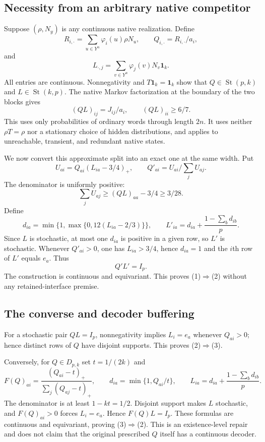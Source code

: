 \documentclass[11pt]{article}
\theoremstyle{remark}\newtheorem{remark}[theorem]{Remark}
\newcommand{\one}{\mathbf 1}
\newcommand{\St}{\operatorname{St}}
\begin{document}
\subsection{Necessity from an arbitrary native competitor}
Suppose $(\rho,N_y)$ is any continuous native realization. Define
\[
 R_{i,\cdot}=\sum_{u\in Y^n}\varphi_i(u)\rho N_u,
 \qquad Q_{i,\cdot}=R_{i,\cdot}/a_i,
\]
and
\[
 L_{\cdot,j}=\sum_{v\in Y^n}\varphi_j(v)N_v\one_k.
\]
All entries are continuous. Nonnegativity and $T\one_k=\one_k$ show that $Q\in\St(p,k)$ and $L\in\St(k,p)$. The native Markov factorization at the boundary of the two blocks gives
\[
 (QL)_{ij}=J_{ij}/a_i,
 \qquad (QL)_{ii}\geq6/7.
\]
This uses only probabilities of ordinary words through length $2n$. It uses neither $\rho T=\rho$ nor a stationary choice of hidden distributions, and applies to unreachable, transient, and redundant native states.

We now convert this approximate split into an exact one at the same width. Put
\[
 U_{ai}=Q_{ai}(L_{ia}-3/4)_+,\qquad
 Q'_{ai}=U_{ai}/\sum_jU_{aj}.
\]
The denominator is uniformly positive:
\[
 \sum_jU_{aj}\geq(QL)_{aa}-3/4\geq3/28.
\]
Define
\[
 d_{ia}=\min\{1,\max\{0,12(L_{ia}-2/3)\}\},\qquad
 L'_{ia}=d_{ia}+\frac{1-\sum_bd_{ib}}p.
\]
Since $L$ is stochastic, at most one $d_{ia}$ is positive in a given row, so $L'$ is stochastic. Whenever $Q'_{ai}>0$, one has $L_{ia}>3/4$, hence $d_{ia}=1$ and the $i$th row of $L'$ equals $e_a$. Thus
\[
 Q'L'=I_p.
\]
The construction is continuous and equivariant. This proves (1)$\Rightarrow$(2) without any retained-interface premise.

\subsection{The converse and decoder buffering}
For a stochastic pair $QL=I_p$, nonnegativity implies $L_i=e_a$ whenever $Q_{ai}>0$; hence distinct rows of $Q$ have disjoint supports. This proves (2)$\Rightarrow$(3).

Conversely, for $Q\in D_{p,k}$ set $t=1/(2k)$ and
\[
 F(Q)_{ai}=\frac{(Q_{ai}-t)_+}{\sum_j(Q_{aj}-t)_+},\qquad
 d_{ia}=\min\{1,Q_{ai}/t\},\qquad
 L_{ia}=d_{ia}+\frac{1-\sum_bd_{ib}}p.
\]
The denominator is at least $1-kt=1/2$. Disjoint support makes $L$ stochastic, and $F(Q)_{ai}>0$ forces $L_i=e_a$. Hence $F(Q)L=I_p$. These formulas are continuous and equivariant, proving (3)$\Rightarrow$(2). This is an existence-level repair and does not claim that the original prescribed $Q$ itself has a continuous decoder.
\end{document}
